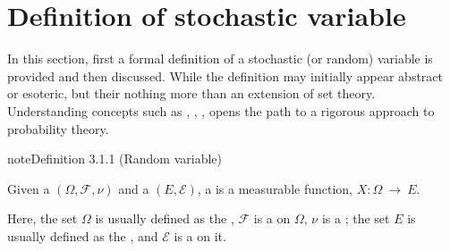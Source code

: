 \documentclass[letterpaper,10pt,english]{jupyterBook}
\begin{document}
\section{Definition of stochastic variable}
\label{\detokenize{ch/prob/rv-def:definition-of-stochastic-variable}}\label{\detokenize{ch/prob/rv-def:prob-rv-def}}\label{\detokenize{ch/prob/rv-def::doc}}
\sphinxAtStartPar
In this section, first a formal definition of a stochastic (or random) variable is provided and then discussed. While the definition may initially appear abstract or esoteric, but their nothing more than an extension of set theory. Understanding concepts such as , , , opens the path to a rigorous approach to probability theory.
\label{ch/prob/rv-def:def:rv}
\begin{sphinxadmonition}{note}{Definition 3.1.1 (Random variable)}



\sphinxAtStartPar
Given a  \((\Omega, \mathcal{F}, \nu)\) and a  \((E, \mathcal{E})\), a  is a measurable function, \(X: \Omega \ \rightarrow \ E\).
\end{sphinxadmonition}

\sphinxAtStartPar
Here, the set \(\Omega\) is usually defined as the , \(\mathcal{F}\) is a  on \(\Omega\), \(\nu\) is a ; the set \(E\) is usually defined as the , and \(\mathcal{E}\) is a  on it.
\end{document}
